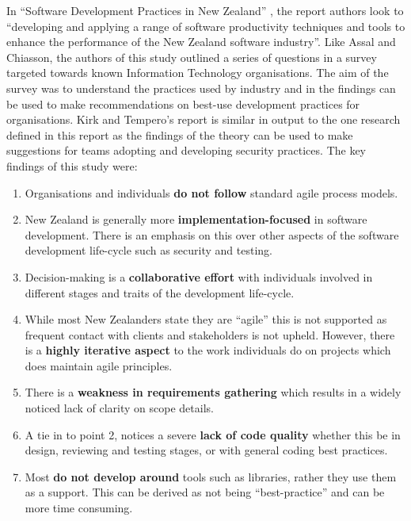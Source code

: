 \par In “Software Development Practices in New Zealand” \cite{summary2}, the report authors look to “developing and applying a range of software productivity techniques and tools to enhance the performance of the New Zealand software industry”. Like Assal and Chiasson, the authors of this study outlined a series of questions in a survey targeted towards known Information Technology organisations. The aim of the survey was to understand the practices used by industry and in the findings can be used to make recommendations on best-use development practices for organisations. Kirk and Tempero’s report is similar in output to the one research defined in this report as the findings of the theory can be used to make suggestions for teams adopting and developing security practices. 
\newline
\newline
The key findings of this study were:

\begin{enumerate}
\item Organisations and individuals \textbf{do not follow} standard agile process models.
\item New Zealand is generally more \textbf{implementation-focused} in software development. There is an emphasis on this over other aspects of the software development life-cycle such as security and testing. 
\item Decision-making is a \textbf{collaborative effort} with individuals involved in different stages and traits of the development life-cycle. 
\item While most New Zealanders state they are “agile” this is not supported as frequent contact with clients and stakeholders is not upheld. However, there is a \textbf{highly iterative aspect} to the work individuals do on projects which does maintain agile principles. 
\item There is a \textbf{weakness in requirements gathering} which results in a widely noticed lack of clarity on scope details. 
\item A tie in to point 2, notices a severe \textbf{lack of code quality} whether this be in design, reviewing and testing stages, or with general coding best practices. 
\item Most \textbf{do not develop around }tools such as libraries, rather they use them as a support. This can be derived as not being “best-practice” and can be more time consuming. 
\end{enumerate}

